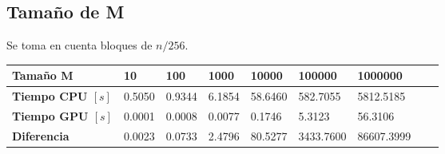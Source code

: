 \subsection{Tamaño de M}

Se toma en cuenta bloques de $n/256$.

\begin{center}
	\begin{tabular}{|l|l|l|l|l|l|l|l|l|}
		\hline
		\textbf{Tamaño M} & \textbf{10} & \textbf{100} & \textbf{1000} & \textbf{10000} & \textbf{100000} & \textbf{1000000}\\\hline
		\textbf{Tiempo CPU $[s]$} & 0.5050  & 0.9344 & 6.1854 & 58.6460 &  582.7055 &  5812.5185\\\hline
		\textbf{Tiempo GPU $[s]$} & 0.0001  & 0.0008 & 0.0077 &  0.1746 &    5.3123 &    56.3106\\\hline
		\textbf{Diferencia} & 0.0023  & 0.0733 & 2.4796 & 80.5277 & 3433.7600 & 86607.3999\\\hline
	\end{tabular}
\end{center}
